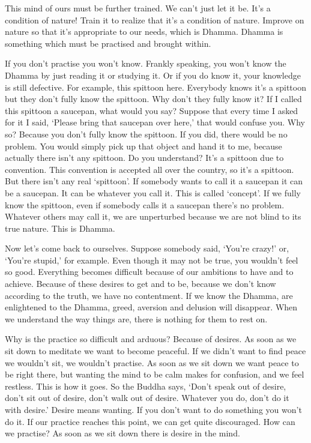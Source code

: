 This mind of ours must be further trained. We can't just let it be. It's a condition of nature! Train it to realize that it's a condition of nature. Improve on nature so that it's appropriate to our needs, which is Dhamma. Dhamma is something which must be practised and brought within. 

If you don't practise you won't know. Frankly speaking, you won't know the Dhamma by just reading it or studying it. Or if you do know it, your knowledge is still defective. For example, this spittoon here. Everybody knows it's a spittoon but they don't fully know the spittoon. Why don't they fully know it? If I called this spittoon a saucepan, what would you say? Suppose that every time I asked for it I said, `Please bring that saucepan over here,' that would confuse you. Why so? Because you don't fully know the spittoon. If you did, there would be no problem. You would simply pick up that object and hand it to me, because actually there isn't any spittoon. Do you understand? It's a spittoon due to convention. This convention is accepted all over the country, so it's a spittoon. But there isn't any real `spittoon'. If somebody wants to call it a saucepan it can be a saucepan. It can be whatever you call it. This is called `concept'. If we fully know the spittoon, even if somebody calls it a saucepan there's no problem. Whatever others may call it, we are unperturbed because we are not blind to its true nature. This is  Dhamma. 

Now let's come back to ourselves. Suppose somebody said, `You're crazy!' or, `You're stupid,' for example. Even though it may not be true, you wouldn't feel so good. Everything becomes difficult because of our ambitions to have and to achieve. Because of these desires to get and to be, because we don't know according to the truth, we have no contentment. If we know the Dhamma, are enlightened to the Dhamma, greed, aversion and delusion will disappear. When we understand the way things are, there is nothing for them to rest on. 

Why is the practice so difficult and arduous? Because of desires. As soon as we sit down to meditate we want to become peaceful. If we didn't want to find peace we wouldn't sit, we wouldn't practise. As soon as we sit down we want peace to be right there, but wanting the mind to be calm makes for confusion, and we feel restless. This is how it goes. So the Buddha says, `Don't speak out of desire, don't sit out of desire, don't walk out of desire. Whatever you do, don't do it with desire.' Desire means wanting. If you don't want to do something you won't do it. If our practice reaches this point, we can get quite discouraged. How can we practise? As soon as we sit down there is desire in the mind. 


